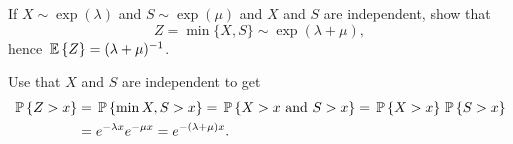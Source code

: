 \begin{question}\label{ex:10}
  If $X\sim\exp(\lambda)$ and $S\sim\exp(\mu)$ and $X$ and $S$ are
  independent, show that 
  \begin{equation*}
Z=\min\{X,S\}\sim\exp(\lambda+\mu),
  \end{equation*}
hence $\E Z = (\lambda+\mu)^{-1}$.


  \begin{solution}
Use that $X$ and $S$ are independent to get
    \begin{equation*}
      \begin{split}
      \P{Z>x} 
&= \P{\min{X,S}>x} = \P{X>x\text{ and } S>x} = \P{X>x}\P{S>x} \\
&= e^{-\lambda x} e^{-\mu x} = e^{-(\lambda+\mu)x}.
      \end{split}
    \end{equation*}
  \end{solution}

\end{question}


